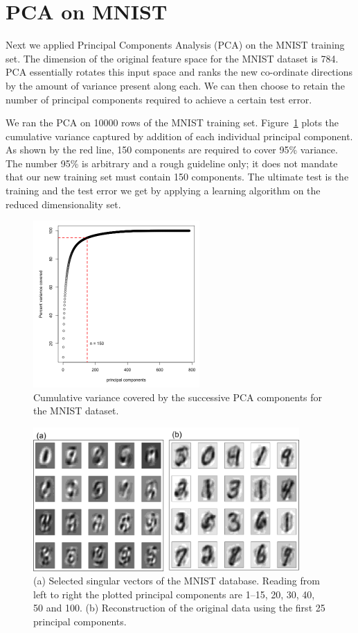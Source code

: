 \documentclass[10pt,letterpaper]{article}
\begin{document}
\section{PCA on MNIST}
Next we applied Principal Components Analysis (PCA) on the MNIST training set. The dimension of the original feature space for the MNIST dataset is 784. PCA essentially rotates this input space and ranks the new co-ordinate directions by the amount of variance present along each. We can then choose to retain the number of principal components required to achieve a certain test error.

We ran the PCA on 10000 rows of the MNIST training set. Figure~\ref{pcacoverage} plots the cumulative variance captured by addition of each individual principal component. As shown by the red line, 150 components are required to cover 95\% variance. The number 95\% is arbitrary and a rough guideline only; it does not mandate that our new training set must contain 150 components. The ultimate test is the training and the test error we get by applying a learning algorithm on the reduced dimensionality set. 
%
\begin{figure}[tbp]
\begin{center}
\includegraphics[width=2.5in]{../plots/pcacoverage.png}
\caption{Cumulative variance covered by the successive PCA components for the MNIST dataset. \label{pcacoverage}}
\end{center}
\end{figure}
%
%
%
\begin{figure}[tbp]
    \begin{center}
    \includegraphics[width=4in]{../plots/pca.png}
    \caption{(a) Selected singular vectors of the MNIST database. Reading from left to right the plotted principal components are 1--15, 20, 30, 40, 50 and 100. (b) Reconstruction of the original data using the first 25 principal components. \label{pcainsight}}
    \end{center}
\end{figure}
\end{document}
